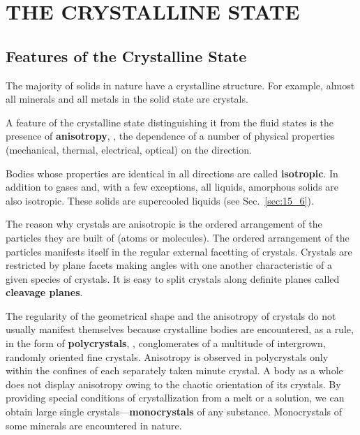 

\chapter{THE CRYSTALLINE STATE}\label{chap:13}

\section{Features of the Crystalline State}\label{sec:13_1}

The majority of solids in nature have a crystalline structure. For example, almost all minerals and all metals in the solid state are crystals.

A feature of the crystalline state distinguishing it from the fluid states is the presence of \textbf{anisotropy}, \ie, the dependence of a number of physical properties (mechanical, thermal, electrical, optical) on the direction.

Bodies whose properties are identical in all directions are called \textbf{isotropic}. In addition to gases and, with a few exceptions, all liquids, amorphous solids are also isotropic. These solids are supercooled liquids (see Sec.~\ref{sec:15_6}).

The reason why crystals are anisotropic is the ordered arrangement of the particles they are built of (atoms or molecules). The ordered arrangement of the particles manifests itself in the regular external facetting of crystals. Crystals are restricted by plane facets making angles with one another characteristic of a given species of crystals. It is easy to split crystals along definite planes called \textbf{cleavage planes}.

The regularity of the geometrical shape and the anisotropy of crystals do not usually manifest themselves because crystalline bodies are encountered, as a rule, in the form of \textbf{polycrystals}, \ie, conglomerates of a multitude of intergrown, randomly oriented fine crystals. Anisotropy is observed in polycrystals only within the confines of each separately taken minute crystal. A body as a whole does not display anisotropy owing to the chaotic orientation of its crystals. By providing special conditions of crystallization from a melt or a solution, we can obtain large single crystals---\textbf{monocrystals} of any substance. Monocrystals of some minerals are encountered in nature.

